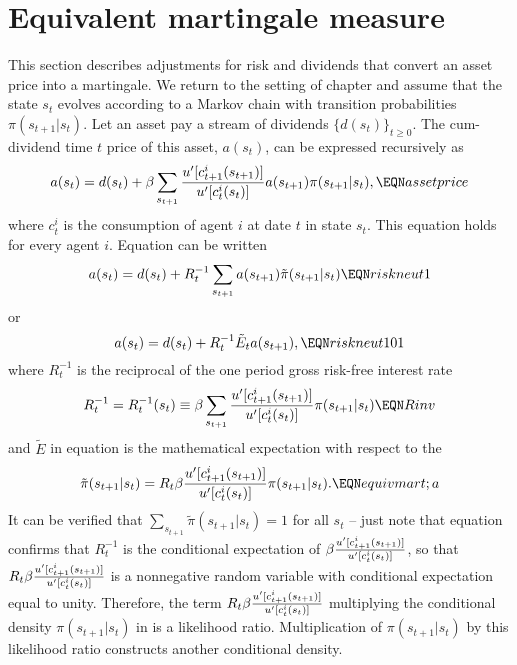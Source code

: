 \section{Equivalent martingale measure}

This section describes adjustments for risk and
dividends that convert an asset price into
a martingale.   We return to the setting of chapter  and assume
that the  state $s_t$  evolves according to a Markov
chain with transition probabilities  $\pi(s_{t+1} | s_t)$.
   Let an asset pay a stream of dividends
$\{d(s_t)\}_{t \geq 0}$.  The cum-dividend time $t$  price
of this asset, $a(s_t)$,  can be expressed recursively as
$$ a(s_t) = d(s_t) + \beta \sum_{s_{t+1}} {u'[c^i_{t+1}(s_{t+1})]
     \over u'[c^i_t(s_t)]} a(s_{t+1}) \pi(s_{t+1} \vert s_t), \EQN assetprice $$
where $c^i_t$ is the consumption of agent $i$ at date $t$ in state $s_t$.  This equation
holds for every agent $i$.
Equation  can be written
$$ a(s_t) = d(s_t) +  R_t^{-1} \sum_{s_{t+1}}
       a(s_{t+1}) \tilde \pi(s_{t+1} \vert s_t) \EQN riskneut1 $$
or
$$ a(s_t) = d(s_t) +  R_t^{-1} \tilde E_t a(s_{t+1}), \EQN riskneut101 $$
where $R_t^{-1}$ is the reciprocal of the one period gross risk-free interest rate
$$   R_t^{-1} = R_t^{-1}(s_t)  \equiv
   \beta \sum_{s_{t+1}} {u'[c^i_{t+1}(s_{t+1})]
        \over u'[c^i_t(s_t)]} \pi(s_{t+1} \vert s_t) \EQN Rinv $$
and $\tilde E$ in equation  is the mathematical expectation with respect to
the 
$$         \tilde \pi(s_{t+1} \vert s_t)  = R_t \beta  {u'[c_{t+1}^i(s_{t+1})]
           \over u'[c_t^i(s_t)]} \pi(s_{t+1} \vert s_t). \EQN equivmart;a $$
It can be verified that $\sum_{s_{t+1}} \tilde \pi(s_{t+1} \vert s_t) =1 $ for
all $s_t$ -- just note that equation  confirms that $R_t^{-1}$ is the conditional expectation of
$\beta  {u'[c_{t+1}^i(s_{t+1})]
           \over u'[c_t^i(s_t)]}$, so that $R_t \beta  {u'[c_{t+1}^i(s_{t+1})]
           \over u'[c_t^i(s_t)]}$ is a nonnegative random variable with conditional expectation equal to unity.  Therefore,
the term $R_t \beta  {u'[c_{t+1}^i(s_{t+1})]
           \over u'[c_t^i(s_t)]}$ multiplying the conditional density $\pi(s_{t+1} \vert s_t)$ in 
is a likelihood ratio.  Multiplication of $\pi(s_{t+1} \vert s_t)$ by this likelihood ratio constructs another
conditional density.



